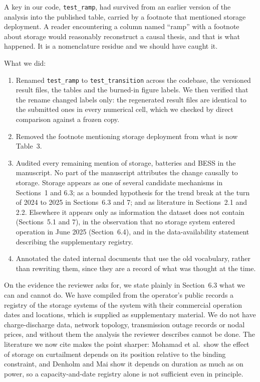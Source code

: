 \documentclass[11pt,a4paper]{article}
\begin{document}
A key in our code, \texttt{test\_ramp}, had survived from an earlier version of the analysis into the published table, carried by a footnote that mentioned storage deployment. A reader encountering a column named ``ramp'' with a footnote about storage would reasonably reconstruct a causal thesis, and that is what happened. It is a nomenclature residue and we should have caught it.

What we did:

\begin{enumerate}[leftmargin=1.6em,itemsep=2pt]
\item Renamed \texttt{test\_ramp} to \texttt{test\_transition} across the codebase, the versioned result files, the tables and the burned-in figure labels. We then verified that the rename changed labels only: the regenerated result files are identical to the submitted ones in every numerical cell, which we checked by direct comparison against a frozen copy.
\item Removed the footnote mentioning storage deployment from what is now Table~3.
\item Audited every remaining mention of storage, batteries and BESS in the manuscript. No part of the manuscript attributes the change causally to storage. Storage appears as one of several candidate mechanisms in Sections~1 and 6.3; as a bounded hypothesis for the trend break at the turn of 2024 to 2025 in Sections~6.3 and 7; and as literature in Sections~2.1 and 2.2. Elsewhere it appears only as information the dataset does not contain (Sections~5.1 and 7), in the observation that no storage system entered operation in June 2025 (Section~6.4), and in the data-availability statement describing the supplementary registry.
\item Annotated the dated internal documents that use the old vocabulary, rather than rewriting them, since they are a record of what was thought at the time.
\end{enumerate}

On the evidence the reviewer asks for, we state plainly in Section~6.3 what we can and cannot do. We have compiled from the operator's public records a registry of the storage systems of the system with their commercial operation dates and locations, which is supplied as supplementary material. We do not have charge-discharge data, network topology, transmission outage records or nodal prices, and without them the analysis the reviewer describes cannot be done. The literature we now cite makes the point sharper: Mohamad et al.\ show the effect of storage on curtailment depends on its position relative to the binding constraint, and Denholm and Mai show it depends on duration as much as on power, so a capacity-and-date registry alone is not sufficient even in principle.
\end{document}
